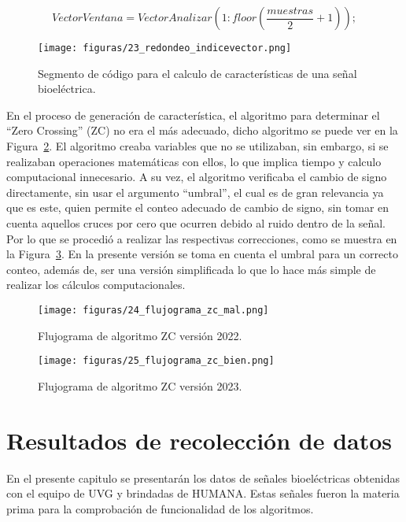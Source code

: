 \begin{equation}
    VectorVentana=VectorAnalizar(1:floor( \frac{muestras}{2} + 1));
    \label{eq: vfeatures_rango}
\end{equation}

\begin{figure}[t]
    \centering
    \texttt{[image: figuras/23\_redondeo\_indicevector.png]}
    \caption{Segmento de código para el calculo de características de una señal bioeléctrica.}
    \label{fig: redondeo minimo}
\end{figure}

En el proceso de generación de característica, el algoritmo para determinar el ``Zero Crossing'' (ZC) no era el más adecuado, dicho algoritmo se puede ver en la Figura~\ref{flu: ZC malo}. 
El algoritmo creaba variables que no se utilizaban, sin embargo, si se realizaban operaciones matemáticas con ellos, lo que implica tiempo y calculo computacional innecesario. A su vez, el algoritmo verificaba el cambio de signo directamente, sin usar el argumento ``umbral'', el cual es de gran relevancia ya que es este, quien permite el conteo adecuado de cambio de signo, sin tomar en cuenta aquellos cruces por cero que ocurren debido al ruido dentro de la señal. 
Por lo que se procedió a realizar las respectivas correcciones, como se muestra en la Figura~\ref{flu: ZC bueno}. En la presente versión se toma en cuenta el umbral para un correcto conteo, además de, ser una versión simplificada lo que lo hace más simple de realizar los cálculos computacionales.

\begin{figure}[t]
    \centering
    \texttt{[image: figuras/24\_flujograma\_zc\_mal.png]}
    \caption{Flujograma de algoritmo ZC versión 2022.}
    \label{flu: ZC malo}
\end{figure}
\begin{figure}[t]
    \centering
    \texttt{[image: figuras/25\_flujograma\_zc\_bien.png]}
    \caption{Flujograma de algoritmo ZC versión 2023.}
    \label{flu: ZC bueno}
\end{figure}

\chapter{Resultados de recolección de datos}
En el presente capitulo se presentarán los datos de señales bioeléctricas obtenidas con el equipo de UVG y brindadas de HUMANA. Estas señales fueron la materia prima para la comprobación de funcionalidad de los algoritmos.

